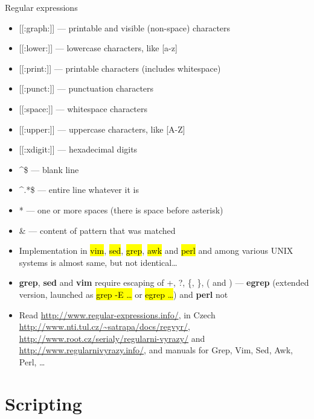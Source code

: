 \documentclass[compress, ucs, xelatex, 11pt, xcolor=svgnames,
  hyperref={
    bookmarks=true,
    unicode=true,
    colorlinks=true,
    pdftitle={Linux, command line and MetaCentrum},
    plainpages=false,
    pdfauthor={Vojtech Zeisek},
    pdfsubject={Course about use of Linux command line, writing shell scripts and using MetaCentrum of CESNET},
    pdfcreator={XeLaTeX, http://www.xelatex.org/},
    pdfkeywords={Linux, GNU, BASH, shell, command line, MetaCentrum},
    linkcolor=Sienna,
    anchorcolor=black,
    citecolor=green,
    filecolor=magenta,
    menucolor=Sienna,
    urlcolor=cyan,
    pdftex},
  url={hyphens, lowtilde} %
  ]{beamer}
\renewcommand{\texttt}[1]{\hl{\ttfamily #1}}
\begin{document}
\begin{frame}[allowframebreaks]{Regular expressions}
\begin{itemize}
  \item \alert{[[:graph:]]} --- printable and visible (non-space) characters
  \item \alert{[[:lower:]]} --- lowercase characters, like \alert{[a-z]}
  \item \alert{[[:print:]]} --- printable characters (includes whitespace)
  \item \alert{[[:punct:]]} --- punctuation characters
  \item \alert{[[:space:]]} --- whitespace characters
  \item \alert{[[:upper:]]} --- uppercase characters, like \alert{[A-Z]}
  \item \alert{[[:xdigit:]]} --- hexadecimal digits
  \item \alert{\textasciicircum\$} --- blank line
  \item \alert{\textasciicircum.*\$} --- entire line whatever it is
  \item \alert{ *} --- one or more spaces (there is space before asterisk)
  \item \alert{\&} --- content of pattern that was matched
  \item Implementation in \texttt{vim}, \texttt{sed}, \texttt{grep}, \texttt{awk} and \texttt{perl} and among various UNIX systems is almost same, but not identical\ldots
  \item \textbf{grep}, \textbf{sed} and \textbf{vim} require escaping of \alert{+}, \alert{?}, \alert{\{}, \alert{\}}, \alert{(} and \alert{)} --- \textbf{egrep} (extended version, launched as \texttt{grep -E \ldots} or \texttt{egrep \ldots}) and \textbf{perl} not
  \item Read \url{http://www.regular-expressions.info/}, in Czech \url{http://www.nti.tul.cz/~satrapa/docs/regvyr/}, \url{http://www.root.cz/serialy/regularni-vyrazy/} and \url{http://www.regularnivyrazy.info/}, and manuals for Grep, Vim, Sed, Awk, Perl, \ldots
\end{itemize}
\end{frame}

\section{Scripting}
\end{document}
